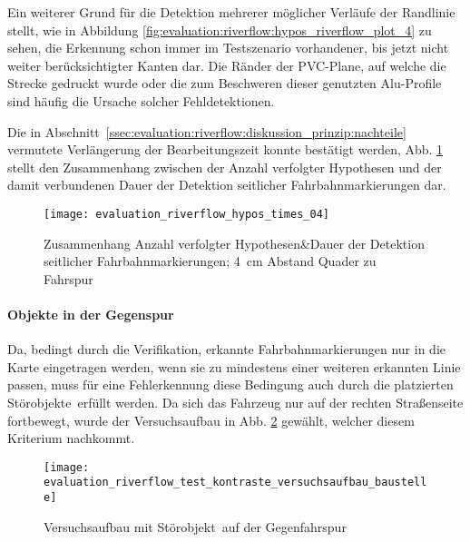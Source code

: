Ein weiterer Grund für die Detektion mehrerer möglicher Verläufe der Randlinie stellt, wie in Abbildung \ref{fig:evaluation:riverflow:hypos_riverflow_plot_4} zu sehen, die Erkennung schon immer im Testszenario vorhandener, bis jetzt nicht weiter berücksichtigter Kanten dar. Die Ränder der PVC-Plane, auf welche die Strecke gedruckt wurde oder die zum Beschweren dieser genutzten Alu-Profile sind häufig die Ursache solcher Fehldetektionen.

Die in Abschnitt~\ref{ssec:evaluation:riverflow:diskussion_prinzip:nachteile} vermutete Verlängerung der Bearbeitungszeit konnte bestätigt werden, Abb. \ref{evaluation:riverflow:hypos:times_04} stellt den Zusammenhang zwischen der Anzahl verfolgter Hypothesen und der damit verbundenen Dauer der Detektion seitlicher Fahrbahnmarkierungen dar.

\begin{figure}[htbp] %
\centering
\texttt{[image: evaluation\_riverflow\_hypos\_times\_04]}
\caption{Zusammenhang Anzahl verfolgter Hypothesen\&Dauer der Detektion seitlicher Fahrbahnmarkierungen; \SI{4}{cm} Abstand Quader zu Fahrspur}
\label{evaluation:riverflow:hypos:times_04}
\end{figure}

\paragraph{Objekte in der Gegenspur}
Da, bedingt durch die Verifikation, erkannte Fahrbahnmarkierungen nur in die Karte eingetragen werden, wenn sie zu mindestens einer weiteren erkannten Linie passen, muss für eine Fehlerkennung diese Bedingung auch durch die platzierten \glqq Störobjekte\grqq\ erfüllt werden. Da sich das Fahrzeug nur auf der rechten Straßenseite fortbewegt, wurde der Versuchsaufbau in Abb. \ref{fig:evaluation:riverflow:test_kontraste_versuchsaufbau_baustelle} gewählt, welcher diesem Kriterium nachkommt.
\begin{figure}[htbp] %
\centering
\texttt{[image: evaluation\_riverflow\_test\_kontraste\_versuchsaufbau\_baustelle]}
\caption{Versuchsaufbau mit \glqq Störobjekt\grqq\ auf der Gegenfahrspur}
\label{fig:evaluation:riverflow:test_kontraste_versuchsaufbau_baustelle}
\end{figure}

